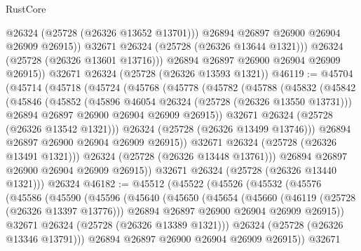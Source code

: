 \begin{lexlean}{RustCore}
\begin{coremodule}
                  @26324
                  (@25728 (@26326 @13652 @13701)))
                @26894
                @26897
                @26900
                @26904
                @26909
                @26915))
            @32671
            @26324
            (@25728 (@26326 @13644 @1321)))
          @26324
          (@25728 (@26326 @13601 @13716)))
        @26894
        @26897
        @26900
        @26904
        @26909
        @26915))
    @32671
    @26324
    (@25728 (@26326 @13593 @1321))
@46119 := @45704
    (@45714
      (@45718
        (@45724
          (@45768
            (@45778
              (@45782
                (@45788
                  (@45832
                    (@45842
                      (@45846
                        (@45852
                          (@45896 @46054 @26324 (@25728 (@26326 @13550 @13731)))
                          @26894
                          @26897
                          @26900
                          @26904
                          @26909
                          @26915))
                      @32671
                      @26324
                      (@25728 (@26326 @13542 @1321)))
                    @26324
                    (@25728 (@26326 @13499 @13746)))
                  @26894
                  @26897
                  @26900
                  @26904
                  @26909
                  @26915))
              @32671
              @26324
              (@25728 (@26326 @13491 @1321)))
            @26324
            (@25728 (@26326 @13448 @13761)))
          @26894
          @26897
          @26900
          @26904
          @26909
          @26915))
      @32671
      @26324
      (@25728 (@26326 @13440 @1321)))
    @26324
@46182 := @45512
    (@45522
      (@45526
        (@45532
          (@45576
            (@45586
              (@45590
                (@45596
                  (@45640
                    (@45650
                      (@45654
                        (@45660
                          (@46119 (@25728 (@26326 @13397 @13776)))
                          @26894
                          @26897
                          @26900
                          @26904
                          @26909
                          @26915))
                      @32671
                      @26324
                      (@25728 (@26326 @13389 @1321)))
                    @26324
                    (@25728 (@26326 @13346 @13791)))
                  @26894
                  @26897
                  @26900
                  @26904
                  @26909
                  @26915))
              @32671

\end{coremodule}
\end{lexlean}
